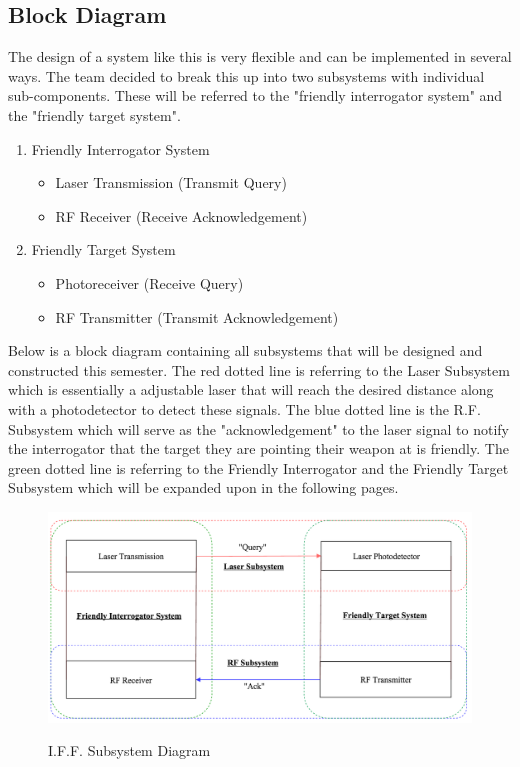 \documentclass[openbib,letterpaper,10pt]{article}
\begin{document}
\begin{spacing}{1.15}
\subsection{Block Diagram}
The design of a system like this is very flexible and can be implemented in several ways. The team decided to break this up into two subsystems with individual sub-components. These will be referred to the "friendly interrogator system" and the "friendly target system". 
\begin{enumerate}
	\item Friendly Interrogator System
	\begin{itemize}
		\item Laser Transmission (Transmit Query)
		\item RF Receiver (Receive Acknowledgement)
	\end{itemize}
	\item Friendly Target System
	\begin{itemize}
		\item Photoreceiver (Receive Query)
		\item RF Transmitter (Transmit Acknowledgement)
	\end{itemize}
\end{enumerate}

Below is a block diagram containing all subsystems that will be designed and constructed this semester. The red dotted line is referring to the Laser Subsystem which is essentially a adjustable laser that will reach the desired distance along with a photodetector to detect these signals. The blue dotted line is the R.F. Subsystem which will serve as the "acknowledgement" to the laser signal to notify the interrogator that the target they are pointing their weapon at is friendly. The green dotted line is referring to the Friendly Interrogator and the Friendly Target Subsystem which will be expanded upon in the following pages.
\begin{figure} [H]
	\centering
	\includegraphics[scale=0.5]{System_Diagram.png}
	\label{fig:system-diagram}
	\caption{I.F.F. Subsystem Diagram}
\end{figure}
\clearpage


\end{spacing}
\end{document}
